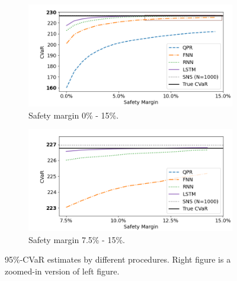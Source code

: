 \documentclass{article}
\begin{document}
\begin{figure}[ht!]
    \centering
    \begin{subfigure}{0.48\textwidth}
        \includegraphics[width=\textwidth]{./figures/CVaR_lower.png}
        \caption{Safety margin 0\% - 15\%.}
        \label{subfig:AllSafetyMargin}
    \end{subfigure}
    \begin{subfigure}{0.48\textwidth}
        \includegraphics[width=\textwidth]{./figures/CVaR_higher.png}
        \caption{Safety margin 7.5\% - 15\%.}
        \label{subfig:ZoomedSafetyMargin}
    \end{subfigure}
    \caption{95\%-CVaR estimates by different procedures. Right figure is a zoomed-in version of left figure.} 
    \label{fig:CVaR95}
\end{figure}
\end{document}
